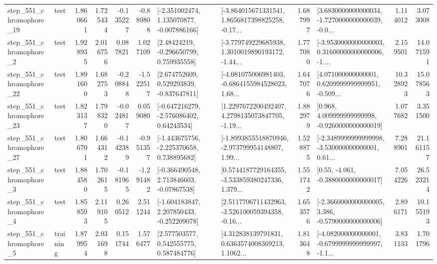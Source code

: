 \begin{tabular}{llrrrrllrlrr}
  step\_551\_chromophore\_19 &      test &      1.860661 &    1.725434 &     -0.135227 & -0.889808 &   [-2.351002474, 1.135070877, -0.007886166] &  [-3.864015671331541, 1.8656817398825258, -0.17... &       1.687997 &  [3.6830000000000034, -1.7270000000000039, -0.0... &            1.114012 &          3.073008 \\
   step\_551\_chromophore\_2 &      test &      1.928935 &    2.016756 &      0.087821 &  1.027109 &     [2.48424219, -0.296650799, 0.759935558] &  [-3.779749229685938, 1.3010019890193172, -1.44... &       1.777080 &  [-3.9530000000000003, 0.31600000000000006, -1.... &            2.159501 &         14.071591 \\
  step\_551\_chromophore\_22 &      test &      1.891600 &    1.682753 &     -0.208848 & -1.522517 &    [2.674752609, 0.529293839, -0.837647811] &  [-4.081075006981403, -0.6864155984528023, 1.68... &       1.647076 &  [4.071000000000001, 0.6209999999999951, -0.509... &           10.328923 &         15.078563 \\
  step\_551\_chromophore\_23 &      test &      1.823137 &    1.798320 &     -0.024817 &  0.059080 &    [-0.647216279, -2.576086402, 0.64243534] &  [1.2297672200492407, 4.2798135073847705, -1.19... &       1.882979 &    [0.968, 4.009999999999998, -0.9260000000000019] &            1.077682 &          3.351500 \\
  step\_551\_chromophore\_27 &      test &      1.806701 &    1.664312 &     -0.142389 & -0.951357 &   [-1.443675756, -2.225370658, 0.738895682] &  [-1.8993855518870946, -2.973799954148807, 1.99... &       1.528875 &  [-2.3489999999999998, -3.530000000000001, 0.61... &            7.288901 &         21.161157 \\
   step\_551\_chromophore\_3 &      test &      1.884580 &    1.702615 &     -0.181965 & -1.291482 &    [-0.366490548, 2.713846603, -0.07867538] &  [0.5744187729164355, -3.533859380247336, 1.379... &       1.551742 &                [0.55, -4.061, -0.3880000000000017] &            7.054226 &         26.523214 \\
   step\_551\_chromophore\_4 &      test &      1.858593 &    2.119105 &      0.260512 &  2.511244 &   [-1.604183847, 2.207850433, -0.252209078] &  [2.5117706711432963, -3.526100059394358, -0.16... &       1.653576 &  [-2.3660000000000005, 3.386, -0.5790000000000006] &            2.896171 &         10.155193 \\
   step\_551\_chromophore\_5 &  training &      1.879954 &    2.031698 &      0.151744 &  1.576477 &     [2.577503577, 0.542555775, 0.587484776] &  [4.312838139791831, 0.6363574008369213, 1.1062... &       1.813648 &  [-4.082000000000001, -0.6799999999999997, -1.1... &            3.831133 &          1.701796 \\

\end{tabular}
